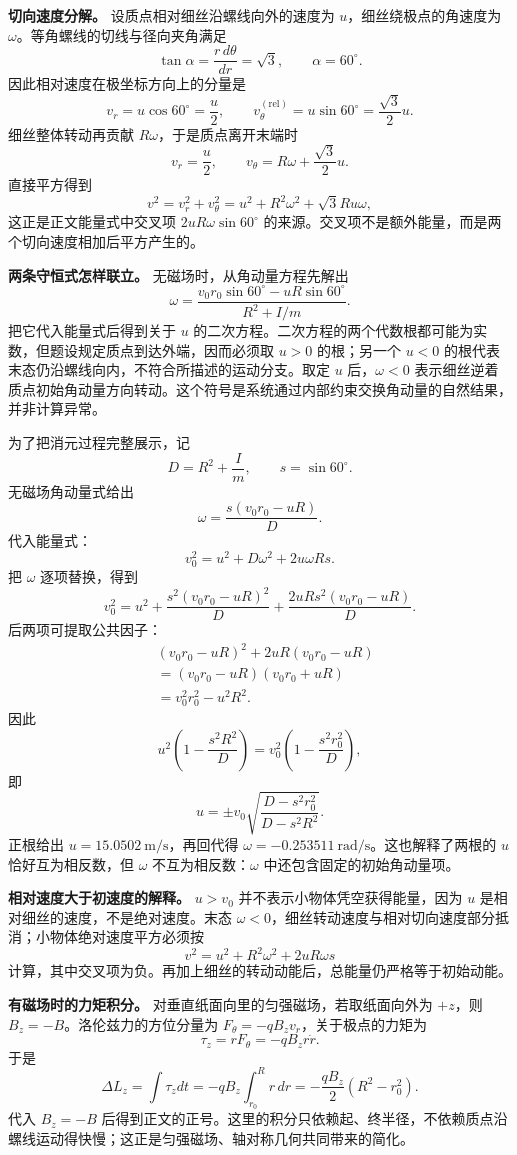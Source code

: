 \documentclass[12pt,a4paper,UTF8]{ctexart}
\begin{document}
\textbf{切向速度分解。} 设质点相对细丝沿螺线向外的速度为
\(u\)，细丝绕极点的角速度为 \(\omega\)。等角螺线的切线与径向夹角满足 \[
\tan\alpha=\frac{r\,d\theta}{dr}=\sqrt3,
\qquad \alpha=60^\circ.
\] 因此相对速度在极坐标方向上的分量是 \[
v_r=u\cos60^\circ=\frac u2,\qquad
v_\theta^{(\mathrm{rel})}=u\sin60^\circ=\frac{\sqrt3}{2}u.
\] 细丝整体转动再贡献 \(R\omega\)，于是质点离开末端时 \[
v_r=\frac u2,\qquad
v_\theta=R\omega+\frac{\sqrt3}{2}u.
\] 直接平方得到 \[
v^2=v_r^2+v_\theta^2
=u^2+R^2\omega^2+\sqrt3Ru\omega,
\] 这正是正文能量式中交叉项 \(2uR\omega\sin60^\circ\)
的来源。交叉项不是额外能量，而是两个切向速度相加后平方产生的。

\textbf{两条守恒式怎样联立。} 无磁场时，从角动量方程先解出 \[
\omega
=\frac{v_0r_0\sin60^\circ-uR\sin60^\circ}
{R^2+I/m}.
\] 把它代入能量式后得到关于 \(u\)
的二次方程。二次方程的两个代数根都可能为实数，但题设规定质点到达外端，因而必须取
\(u>0\) 的根；另一个 \(u<0\)
的根代表末态仍沿螺线向内，不符合所描述的运动分支。取定 \(u\)
后，\(\omega<0\)
表示细丝逆着质点初始角动量方向转动。这个符号是系统通过内部约束交换角动量的自然结果，并非计算异常。

为了把消元过程完整展示，记 \[
D=R^2+\frac Im,\qquad s=\sin60^\circ.
\] 无磁场角动量式给出 \[
\omega=\frac{s(v_0r_0-uR)}D.
\] 代入能量式： \[
v_0^2=u^2+D\omega^2+2u\omega Rs.
\] 把 \(\omega\) 逐项替换，得到 \[
v_0^2
=u^2+\frac{s^2(v_0r_0-uR)^2}{D}
+\frac{2uRs^2(v_0r_0-uR)}D.
\] 后两项可提取公共因子： \[
\begin{aligned}
&(v_0r_0-uR)^2+2uR(v_0r_0-uR)\\
&=(v_0r_0-uR)(v_0r_0+uR)\\
&=v_0^2r_0^2-u^2R^2.
\end{aligned}
\] 因此 \[
u^2\left(1-\frac{s^2R^2}{D}\right)
=v_0^2\left(1-\frac{s^2r_0^2}{D}\right),
\] 即 \[
u=\pm v_0
\sqrt{\frac{D-s^2r_0^2}{D-s^2R^2}}.
\] 正根给出 \(u=15.0502\ \mathrm{m/s}\)，再回代得
\(\omega=-0.253511\ \mathrm{rad/s}\)。这也解释了两根的 \(u\)
恰好互为相反数，但 \(\omega\) 不互为相反数：\(\omega\)
中还包含固定的初始角动量项。

\textbf{相对速度大于初速度的解释。} \(u>v_0\)
并不表示小物体凭空获得能量，因为 \(u\)
是相对细丝的速度，不是绝对速度。末态
\(\omega<0\)，细丝转动速度与相对切向速度部分抵消；小物体绝对速度平方必须按
\[
v^2=u^2+R^2\omega^2+2uR\omega s
\]
计算，其中交叉项为负。再加上细丝的转动动能后，总能量仍严格等于初始动能。

\textbf{有磁场时的力矩积分。} 对垂直纸面向里的匀强磁场，若取纸面向外为
\(+z\)，则 \(B_z=-B\)。洛伦兹力的方位分量为
\(F_\theta=-qB_zv_r\)，关于极点的力矩为 \[
\tau_z=rF_\theta=-qB_zr\dot r.
\] 于是 \[
\Delta L_z
=\int\tau_zdt
=-qB_z\int_{r_0}^{R}r\,dr
=-\frac{qB_z}{2}(R^2-r_0^2).
\] 代入 \(B_z=-B\)
后得到正文的正号。这里的积分只依赖起、终半径，不依赖质点沿螺线运动得快慢；这正是匀强磁场、轴对称几何共同带来的简化。
\end{document}
